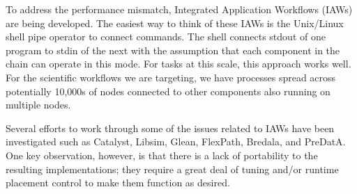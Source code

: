 \documentclass[conference]{IEEEtran}
\begin{document}
To address the performance mismatch, Integrated Application Workflows (IAWs)
are being developed. The easiest way to think of these IAWs is the Unix/Linux
shell pipe operator to connect commands. The shell connects stdout of one
program to stdin of the next with the assumption that each component in the
chain can operate in this mode. For tasks at this scale, this approach works
well. For the scientific workflows we are targeting, we have processes spread
across potentially 10,000s of nodes connected to other components also running
on multiple nodes.


Several efforts to work through some of the issues related to IAWs have been
investigated such as Catalyst, Libsim, Glean, FlexPath, Bredala, and PreDatA.
One key
observation, however, is that there is a lack of portability to the resulting
implementations; they require a great deal of tuning and/or runtime placement
control to make them function as desired.
\end{document}
